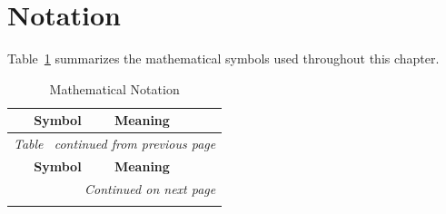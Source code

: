 \section{Notation}
\label{sec:notation}

Table~\ref{tab:notation} summarizes the mathematical symbols used throughout this chapter.

{\small
\begin{longtable}{|c|p{10cm}|}
\caption{Mathematical Notation} \label{tab:notation} \\
\hline
\textbf{Symbol} & \textbf{Meaning} \\
\hline
\endfirsthead

\multicolumn{2}{c}{\textit{Table~\thetable{} continued from previous page}} \\
\hline
\textbf{Symbol} & \textbf{Meaning} \\
\hline
\endhead

\hline
\multicolumn{2}{r}{\textit{Continued on next page}} \\
\endfoot

\hline
\endlastfoot


\end{longtable}}
